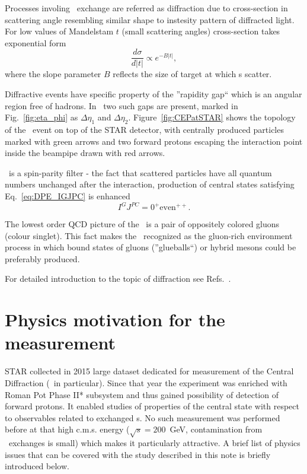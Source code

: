 Processes involing \Pomeron\  exchange are referred as diffraction due to cross-section in scattering angle resembling similar shape to instesity pattern of diffracted light. For low values of Mandelstam $t$ (small scattering angles) cross-section takes exponential form\vspace{-2pt}
\begin{equation}
 \frac{d\sigma}{d|t|} \propto e^{-B|t|},
\end{equation}%
where the slope parameter $B$ reflects the size of target at which \Pomeron s scatter.

Diffractive events have specific property of the ''rapidity gap`` which is an angular region free of hadrons. In \DPE\ two such gaps are present, marked in Fig.~\ref{fig:eta_phi} as $\Delta\eta_{1}$ and $\Delta\eta_{2}$. Figure~\ref{fig:CEPatSTAR} shows the topology of the \DPE\ event on top of the STAR detector, with centrally produced particles marked with green arrows and two forward protons escaping the interaction point inside the beampipe drawn with red arrows.%

\DPE\ is a spin-parity filter - the fact that scattered particles have all quantum numbers unchanged after the interaction, production of central states satisfying Eq.~\eqref{eq:DPE_IGJPC} is enhanced
\begin{equation}\label{eq:DPE_IGJPC}
 I^{G}J^{PC}=0^{+}\textrm{even}^{++}.
\end{equation}%

The lowest order QCD picture of the \Pomeron\ is a pair of oppositely colored gluons (colour singlet). This fact makes the \DPE\ recognized as the gluon-rich environment process in which bound states of gluons (''glueballs``) or hybrid mesons could be preferably produced.

For detailed introduction to the topic of diffraction see Refs.~\cite{pomeronAndQCD,barone}.%

\section{Physics motivation for the measurement}
STAR collected in 2015 large dataset dedicated for measurement of the Central Diffraction (\DPE\ in particular). Since that year the experiment was enriched with Roman Pot Phase II* subsystem and thus gained possibility of detection of forward protons. It enabled studies of properties of the central state with respect to observables related to exchanged \Pomeron s. No such measurement was performed before at that high c.m.s. energy ($\sqrt{s}=200$~GeV, contamination from \Reggeon\ exchanges is small) which makes it particularly attractive. A brief list of physics issues that can be covered with the study described in this note is briefly introduced below.%
%
